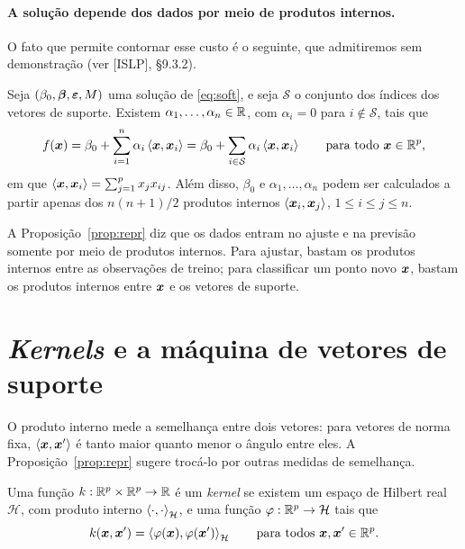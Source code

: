 \documentclass[11pt,a4paper]{article}
\begin{document}
\paragraph{A solução depende dos dados por meio de produtos internos.} O fato que
permite contornar esse custo é o seguinte, que admitiremos sem demonstração (ver
[ISLP], §9.3.2).

\begin{proposicao}\label{prop:repr}
Seja $(\beta_0,\bm{\beta},\bm\varepsilon,M)$ uma solução de \eqref{eq:soft}, e seja
$\mathcal S$ o conjunto dos índices dos vetores de suporte. Existem
$\alpha_1,\dots,\alpha_n\in\mathbb{R}$, com $\alpha_i=0$ para $i\notin\mathcal S$, tais que
\begin{equation}\label{eq:repr}
  f(\bm{x})=\beta_0+\sum_{i=1}^n\alpha_i\left\langle \bm{x}, \bm{x}_i \right\rangle
       =\beta_0+\sum_{i\in\mathcal S}\alpha_i\left\langle \bm{x}, \bm{x}_i \right\rangle
  \qquad\text{para todo }\bm{x}\in\mathbb{R}^p,
\end{equation}
em que $\left\langle \bm{x}, \bm{x}_i \right\rangle=\sum_{j=1}^px_jx_{ij}$. Além disso, $\beta_0$ e
$\alpha_1,\dots,\alpha_n$ podem ser calculados a partir apenas dos $n(n+1)/2$ produtos
internos $\left\langle \bm{x}_i, \bm{x}_j \right\rangle$, $1\le i\le j\le n$.
\end{proposicao}

A Proposição~\ref{prop:repr} diz que os dados entram no ajuste e na previsão somente
por meio de produtos internos. Para ajustar, bastam os produtos internos entre as
observações de treino; para classificar um ponto novo $\bm{x}$, bastam os produtos
internos entre $\bm{x}$ e os vetores de suporte.

\section{\emph{Kernels} e a máquina de vetores de suporte}
O produto interno mede a semelhança entre dois vetores: para vetores de norma fixa,
$\left\langle \bm{x}, \bm{x}' \right\rangle$ é tanto maior quanto menor o ângulo entre eles. A
Proposição~\ref{prop:repr} sugere trocá-lo por outras medidas de semelhança.

\begin{definicao}
Uma função $k:\mathbb{R}^p\times\mathbb{R}^p\to\mathbb{R}$ é um \emph{kernel} se existem um espaço de Hilbert
real $\mathcal H$, com produto interno $\left\langle \cdot, \cdot \right\rangle_{\mathcal H}$, e uma
função $\varphi:\mathbb{R}^p\to\mathcal H$ tais que
\[
  k(\bm{x},\bm{x}')=\left\langle \varphi(\bm{x}), \varphi(\bm{x}') \right\rangle_{\mathcal H}
  \qquad\text{para todos }\bm{x},\bm{x}'\in\mathbb{R}^p.
\]
\end{definicao}
\end{document}
